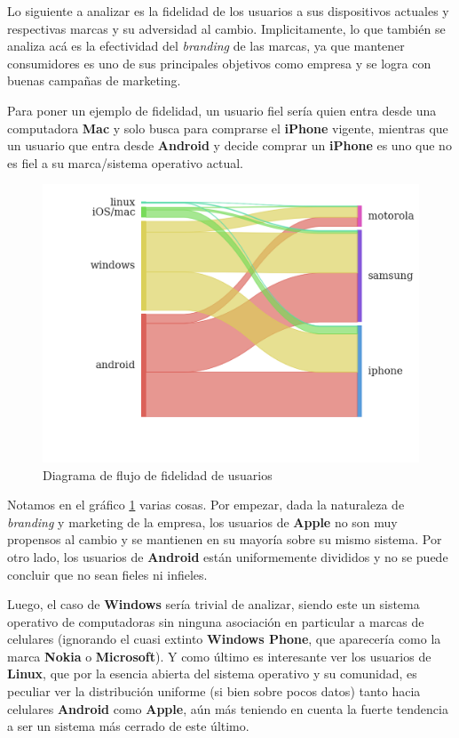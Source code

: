 \documentclass[a4paper]{article}
\begin{document}
Lo siguiente a analizar es la fidelidad de los usuarios a sus dispositivos actuales y respectivas marcas y su adversidad al cambio. Implicitamente, lo que también se analiza acá es la efectividad del \textit{branding} de las marcas, ya que mantener consumidores es uno de sus principales objetivos como empresa y se logra con buenas campañas de marketing.

Para poner un ejemplo de fidelidad, un usuario fiel sería quien entra desde una computadora \textbf{Mac} y solo busca para comprarse el \textbf{iPhone} vigente, mientras que un usuario que entra desde \textbf{Android} y decide comprar un \textbf{iPhone} es uno que no es fiel a su marca/sistema operativo actual.

\begin{figure}[h!]
	\includegraphics[width=\linewidth]{figures/151-os_brands-sankey.png}
	\caption{Diagrama de flujo de fidelidad de usuarios}
	\label{fig:sankey}
\end{figure}

Notamos en el gráfico \ref{fig:sankey} varias cosas. Por empezar, dada la naturaleza de \textit{branding} y marketing de la empresa, los usuarios de \textbf{Apple} no son muy propensos al cambio y se mantienen en su mayoría sobre su mismo sistema. Por otro lado, los usuarios de \textbf{Android} están uniformemente divididos y no se puede concluir que no sean fieles ni infieles. 

Luego, el caso de \textbf{Windows} sería trivial de analizar, siendo este un sistema operativo de computadoras sin ninguna asociación en particular a marcas de celulares (ignorando el cuasi extinto \textbf{Windows Phone}, que aparecería como la marca \textbf{Nokia} o \textbf{Microsoft}). Y como último es interesante ver los usuarios de \textbf{Linux}, que por la esencia abierta del sistema operativo y su comunidad, es peculiar ver la distribución uniforme (si bien sobre pocos datos) tanto hacia celulares \textbf{Android} como \textbf{Apple}, aún más teniendo en cuenta la fuerte tendencia a ser un sistema más cerrado de este último.
\end{document}
